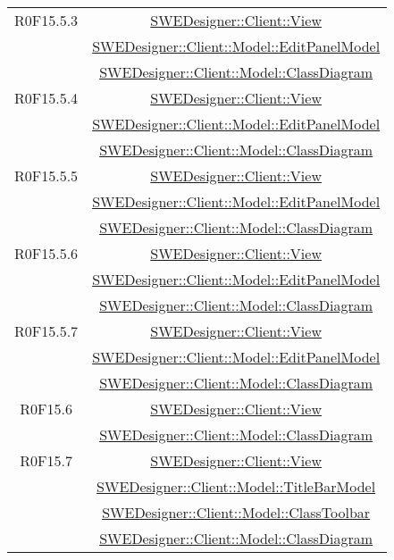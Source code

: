\documentclass[../SpecificaTecnica.tex]{subfiles}
\begin{document}
\begin{longtable}{|c|c|}
		R0F15.5.3 & \hyperlink{SWEDesigner::Client::View}{SWEDesigner::Client::View}\\& \hyperlink{SWEDesigner::Client::Model::EditPanelModel}{SWEDesigner::Client::Model::EditPanelModel}\\& \hyperlink{SWEDesigner::Client::Model::ClassDiagram}{SWEDesigner::Client::Model::ClassDiagram} \\\hline
		R0F15.5.4 & \hyperlink{SWEDesigner::Client::View}{SWEDesigner::Client::View}\\& \hyperlink{SWEDesigner::Client::Model::EditPanelModel}{SWEDesigner::Client::Model::EditPanelModel}\\& \hyperlink{SWEDesigner::Client::Model::ClassDiagram}{SWEDesigner::Client::Model::ClassDiagram} \\\hline
		R0F15.5.5 & \hyperlink{SWEDesigner::Client::View}{SWEDesigner::Client::View}\\& \hyperlink{SWEDesigner::Client::Model::EditPanelModel}{SWEDesigner::Client::Model::EditPanelModel}\\& \hyperlink{SWEDesigner::Client::Model::ClassDiagram}{SWEDesigner::Client::Model::ClassDiagram} \\\hline
		R0F15.5.6 & \hyperlink{SWEDesigner::Client::View}{SWEDesigner::Client::View}\\& \hyperlink{SWEDesigner::Client::Model::EditPanelModel}{SWEDesigner::Client::Model::EditPanelModel}\\& \hyperlink{SWEDesigner::Client::Model::ClassDiagram}{SWEDesigner::Client::Model::ClassDiagram} \\\hline
		R0F15.5.7 & \hyperlink{SWEDesigner::Client::View}{SWEDesigner::Client::View}\\& \hyperlink{SWEDesigner::Client::Model::EditPanelModel}{SWEDesigner::Client::Model::EditPanelModel}\\& \hyperlink{SWEDesigner::Client::Model::ClassDiagram}{SWEDesigner::Client::Model::ClassDiagram} \\\hline
		R0F15.6 & \hyperlink{SWEDesigner::Client::View}{SWEDesigner::Client::View}\\& \hyperlink{SWEDesigner::Client::Model::ClassDiagram}{SWEDesigner::Client::Model::ClassDiagram}\\\hline
		R0F15.7 & \hyperlink{SWEDesigner::Client::View}{SWEDesigner::Client::View}\\& \hyperlink{SWEDesigner::Client::Model::TitleBarModel}{SWEDesigner::Client::Model::TitleBarModel}\\& \hyperlink{SWEDesigner::Client::Model::ClassToolbar}{SWEDesigner::Client::Model::ClassToolbar}\\& \hyperlink{SWEDesigner::Client::Model::ClassDiagram}{SWEDesigner::Client::Model::ClassDiagram}\\\hline

\end{longtable}
\end{document}
